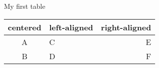 \documentclass{beamer}
\begin{document}
\begin{frame}{My first table}
\begin{tabular}{|c||l||r|}
\hline
    centered & left-aligned & right-aligned \\ 
\hline
    A & C & E\\ 
\hline
    B & D & F\\ 
\hline
\end{tabular}
\end{frame}
\end{document}
